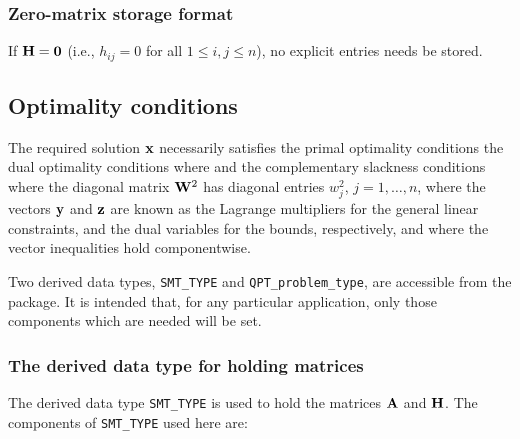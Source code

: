 \documentclass{galahad}
\newcommand{\packagename}{QPT}
\begin{document}
\subsubsection{Zero-matrix storage format}\label{zero}
If ${\mathbf{H}} = {\mathbf{0}}$ (i.e., $h_{ij} = 0$ for all $1 \leq i, j \leq n$),
no explicit entries needs be stored.


\subsection{Optimality conditions\label{galopt}}

The required solution ${\mathbf{x}}$ necessarily satisfies
the primal optimality conditions
the dual optimality conditions
where
and the complementary slackness conditions
where the diagonal matrix ${\mathbf{W}}^{2}$ has diagonal entries $w_{j}^{2}$,
$j = 1, \ldots , n$, where the vectors ${\mathbf{y}}$ and ${\mathbf{z}}$ are
known as the Lagrange multipliers for
the general linear constraints, and the dual variables for the bounds,
respectively, and where the vector inequalities hold componentwise.


\galtype
Two derived data types,
{\tt SMT\_TYPE} and
{\tt \packagename\_problem\_type},
are accessible from the package. It is intended that, for any particular
application, only those components which are needed will be set.


\subsubsection{The derived data type for holding matrices}\label{typesmt}
The derived data type {\tt SMT\_TYPE} is used to hold the matrices ${\mathbf{A}}$
and ${\mathbf{H}}$. The components of {\tt SMT\_TYPE} used here are:
\end{document}
